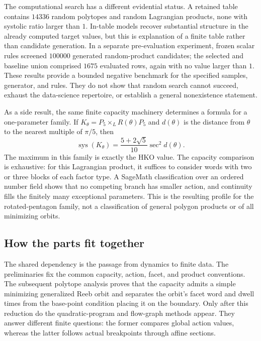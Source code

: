 The computational search has a different evidential status.  A retained table
contains $14336$ random polytopes and random Lagrangian products, none with
systolic ratio larger than $1$.  In-table models recover substantial
structure in the already computed target values, but this is explanation of a
finite table rather than candidate generation.  In a separate pre-evaluation
experiment, frozen scalar rules screened $100000$ generated random-product
candidates; the selected and baseline union comprised $1675$ evaluated
rows, again with no value larger than $1$.  These results provide a bounded
negative benchmark for the specified samples, generator, and rules.  They do
not show that random search cannot succeed, exhaust the data-science
repertoire, or establish a general nonexistence statement.

As a side result, the same finite capacity machinery determines a formula for
a one-parameter family.  If
\(K_\theta=P_5\times_L R(\theta)P_5\) and
\(d(\theta)\) is the distance from \(\theta\) to the nearest multiple of
\(\pi/5\), then
\[
  \operatorname{sys}(K_\theta)
  =\frac{5+2\sqrt5}{10}\sec^2 d(\theta).
\]
The maximum in this family is exactly the HKO value.  The capacity comparison
is exhaustive: for this Lagrangian product, it suffices to consider words with
two or three blocks of each factor type.  A SageMath classification over an
ordered number field
shows that no competing branch has smaller action, and continuity fills the
finitely many exceptional parameters.  This is the resulting profile for the
rotated-pentagon family, not a classification of general polygon products or
of all minimizing orbits.

\subsection{How the parts fit together}

The shared dependency is the passage from dynamics to finite data.  The
preliminaries fix the common capacity, action, facet, and product conventions.
The subsequent polytope analysis proves that the capacity admits a simple
minimizing generalized Reeb orbit and separates the orbit's facet word and
dwell times
from the base-point condition placing it on the boundary.  Only after this
reduction do the quadratic-program and flow-graph methods appear.  They answer
different finite questions: the former compares global action values, whereas
the latter follows actual breakpoints through affine sections.

